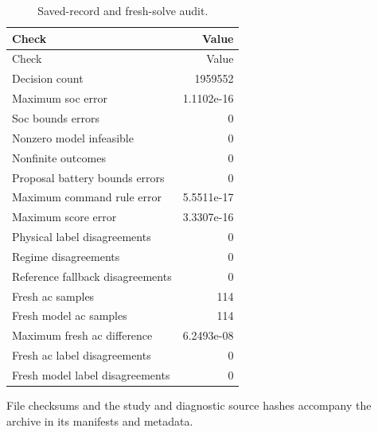 \documentclass[11pt]{article}
\begin{document}
\small\begin{longtable}{lr}
\caption{Saved-record and fresh-solve audit.}\\\toprule
Check & Value\\\midrule
\endfirsthead
\toprule
Check & Value\\\midrule
\endhead
\bottomrule\endfoot
Decision count & 1959552\\
Maximum soc error & 1.1102e-16\\
Soc bounds errors & 0\\
Nonzero model infeasible & 0\\
Nonfinite outcomes & 0\\
Proposal battery bounds errors & 0\\
Maximum command rule error & 5.5511e-17\\
Maximum score error & 3.3307e-16\\
Physical label disagreements & 0\\
Regime disagreements & 0\\
Reference fallback disagreements & 0\\
Fresh ac samples & 114\\
Fresh model ac samples & 114\\
Maximum fresh ac difference & 6.2493e-08\\
Fresh ac label disagreements & 0\\
Fresh model label disagreements & 0\\
\end{longtable}\normalsize
File checksums and the study and diagnostic source hashes accompany the archive in its manifests and metadata.
\end{document}

